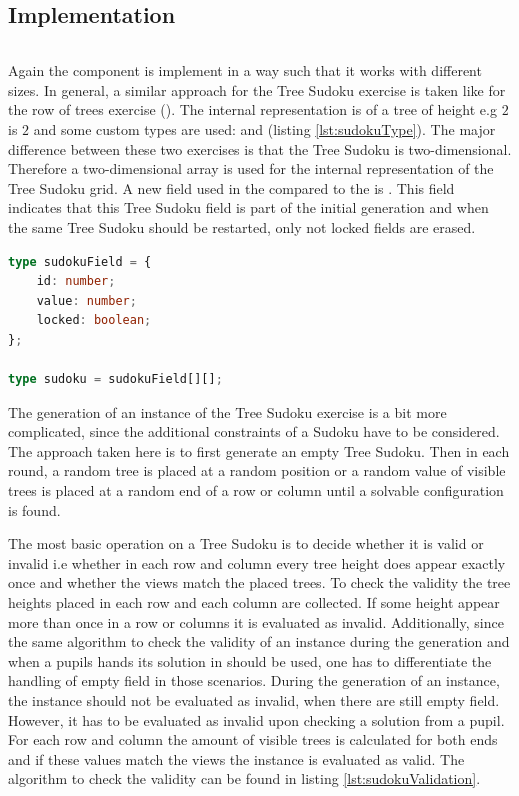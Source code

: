 \subsection{Implementation}

\begin{lstlisting}[language=TypeScript,caption={},label={lst:}]
\end{lstlisting}

Again the  component is implement in a way such that it works with different sizes. In general, a similar approach for the Tree Sudoku exercise is taken like for the row of trees exercise (). The internal representation is of a tree of height e.g $2$ is $2$ and some custom types are used:  and  (listing \ref{lst:sudokuType}). The major difference between these two exercises is that the Tree Sudoku is two-dimensional. Therefore a two-dimensional array is used for the internal representation of the Tree Sudoku grid. A new field used in the  compared to the  is . This field indicates that this Tree Sudoku field is part of the initial generation and when the same Tree Sudoku should be restarted, only not locked fields are erased.

\begin{lstlisting}[language=TypeScript,caption={Definition of the custom sudoku and sudokuField type},label={lst:sudokuType}]
type sudokuField = {
    id: number;
    value: number;
    locked: boolean;
};

type sudoku = sudokuField[][];
\end{lstlisting}

The generation of an instance of the Tree Sudoku exercise is a bit more complicated, since the additional constraints of a Sudoku have to be considered. The approach taken here is to first generate an empty Tree Sudoku. Then in each round, a random tree is placed at a random position or a random value of visible trees is placed at a random end of a row or column until a solvable configuration is found. 

The most basic operation on a Tree Sudoku is to decide whether it is valid or invalid i.e whether in each row and column every tree height does appear exactly once and whether the views match the placed trees.
To check the validity the tree heights placed in each row and each column are collected. If some height appear more than once in a row or columns it is evaluated as invalid. Additionally, since the same algorithm to check the validity of an instance during the generation and when a pupils hands its solution in should be used, one has to differentiate the handling of empty field in those scenarios. During the generation of an instance, the instance should not be evaluated as invalid, when there are still empty field. However, it has to be evaluated as invalid upon checking a solution from a pupil. 
For each row and column the amount of visible trees is calculated for both ends and if these values match the views the instance is evaluated as valid. The algorithm to check the validity can be found in listing \ref{lst:sudokuValidation}.

